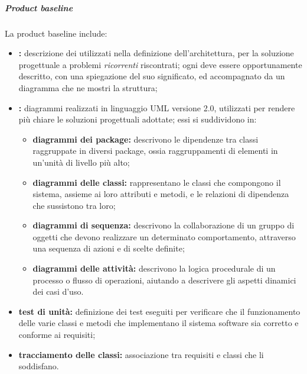 					\subparagraph{Product baseline}
						La product baseline include:
						\begin{itemize}
							\item \textbf{\glock{design pattern}:} descrizione dei  utilizzati nella definizione dell'architettura, per la soluzione progettuale a problemi \textit{ricorrenti} riscontrati; ogni  deve essere opportunamente descritto, con una spiegazione del suo significato, ed accompagnato da un diagramma che ne mostri la struttura;
							\item \textbf{:} diagrammi realizzati in linguaggio UML versione 2.0, utilizzati per rendere più chiare le soluzioni progettuali adottate; essi si suddividono in:
							\begin{itemize}
								\item \textbf{diagrammi dei package:} descrivono le dipendenze tra classi raggruppate in diversi package, ossia raggruppamenti di elementi in un'unità di livello più alto;
								\item \textbf{diagrammi delle classi:} rappresentano le classi che compongono il sistema, assieme ai loro attributi e metodi, e le relazioni di dipendenza che sussistono tra loro;			
								\item \textbf{diagrammi di sequenza:} descrivono la collaborazione di un gruppo di oggetti che devono realizzare un determinato comportamento, attraverso una sequenza di azioni e di scelte definite;
								\item \textbf{diagrammi delle attività:} descrivono la logica procedurale di un processo o flusso di operazioni, aiutando a descrivere gli aspetti dinamici dei casi d'uso.
							\end{itemize}
							\item \textbf{test di unità:} definizione dei test eseguiti per verificare che il funzionamento delle varie classi e metodi che implementano il sistema software sia corretto e conforme ai requisiti;
							\item \textbf{tracciamento delle classi:} associazione tra requisiti e classi che li soddisfano.
						\end{itemize}
					
